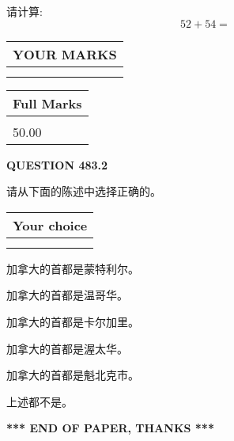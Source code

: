 \documentclass{ctexart}
\begin{document}
  
 
请计算:
\begin{equation}
52 +  %
54 = \nonumber
\end{equation}
 

 

 
  
\vspace{0.2in}
  
\noindent\begin{tabular}{|l|}
\hline
 YOUR MARKS  \\
\hline
 \\ 
 \\ 
\hline
\end{tabular}
\hspace{0.05in} \begin{tabular}{|l|}
\hline
 Full Marks  \\
\hline
 \\ 
50.00 \\
\hline
\end{tabular}
{\textbf{\Large{QUESTION
483.2 
}}}
  
  
请从下面的陈述中选择正确的。
  
  
\noindent\hspace{3.0in} \begin{tabular}{|l|}
\hline
Your choice \\
\hline
 \\ 
 \\ 
\hline
\end{tabular}
  
  
 
 
加拿大的首都是蒙特利尔。
 
 
加拿大的首都是温哥华。
 
 
加拿大的首都是卡尔加里。
 
 
加拿大的首都是渥太华。
 
 
加拿大的首都是魁北克市。
 
 
 上述都不是。
 
 
   
   
 \vspace{0.2in}
 
   
   
   
   
\vspace{1.0in} 
{\textbf{\large{ *** END OF PAPER, THANKS *** }}} 
   
\end{document}
